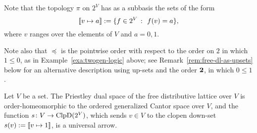   Note that the topology $\pi$ on $2^V$ has as a subbasis the sets of the form
  \[ \llbracket {v \mapsto a} \rrbracket := \{ f \in 2^V \ \colon \ f(v) = a \},\]
  where $v$ ranges over the elements of $V$ and $a = 0,1$. 

  Note also that $\preceq$ is the pointwise order with respect to the order on $2$ in which $1 \leq 0$, as in Example~\ref{exa:twogen-logic} above; see Remark~\ref{rem:free-dl-as-upsets} below for an alternative description using up-sets and the order ${\bf 2}$, in which $0 \leq 1$.%

  \begin{proposition}\label{prop:freeDL-duality}  
  Let $V$ be a set. The Priestley dual space of the free distributive lattice over $V$ is order-homeomorphic to the ordered generalized Cantor space over $V$, and the function $s \colon V \to \mathrm{ClpD}(2^V)$, which sends $v \in V$ to the clopen down-set $s(v) := \llbracket {v \mapsto 1} \rrbracket$, is a universal arrow. 
  \end{proposition}
  

